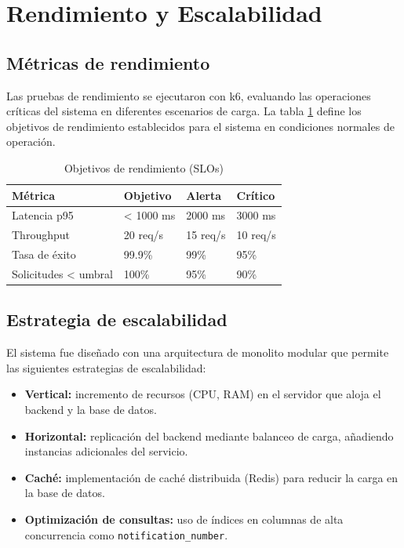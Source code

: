 \documentclass[12pt,letterpaper]{article}
\begin{document}
\section{Rendimiento y Escalabilidad}

\subsection{Métricas de rendimiento}

Las pruebas de rendimiento se ejecutaron con k6, evaluando las operaciones críticas del sistema en diferentes escenarios de carga. La tabla \ref{tab:slo} define los objetivos de rendimiento establecidos para el sistema en condiciones normales de operación.

\begin{table}[H]
\centering
\caption{Objetivos de rendimiento (SLOs)}
\label{tab:slo}
\begin{tabular}{|l|l|l|l|}
\hline
\textbf{Métrica} & \textbf{Objetivo} & \textbf{Alerta} & \textbf{Crítico} \\ \hline
Latencia p95 & < 1000 ms & 2000 ms & 3000 ms \\ \hline
Throughput & 20 req/s & 15 req/s & 10 req/s \\ \hline
Tasa de éxito & 99.9\% & 99\% & 95\% \\ \hline
Solicitudes < umbral & 100\% & 95\% & 90\% \\ \hline
\end{tabular}
\end{table}

\subsection{Estrategia de escalabilidad}

El sistema fue diseñado con una arquitectura de monolito modular que permite las siguientes estrategias de escalabilidad:

\begin{itemize}
    \item \textbf{Vertical:} incremento de recursos (CPU, RAM) en el servidor que aloja el backend y la base de datos.
    \item \textbf{Horizontal:} replicación del backend mediante balanceo de carga, añadiendo instancias adicionales del servicio.
    \item \textbf{Caché:} implementación de caché distribuida (Redis) para reducir la carga en la base de datos.
    \item \textbf{Optimización de consultas:} uso de índices en columnas de alta concurrencia como \texttt{notification\_number}.
\end{itemize}
\end{document}
